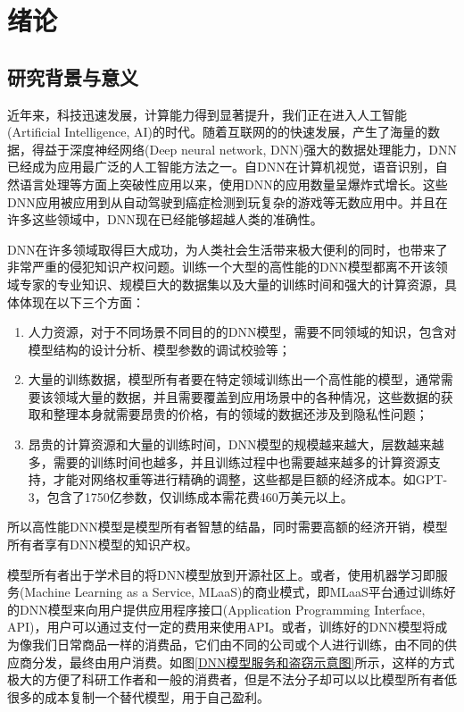 
\chapter{绪论}
\label{1}


\section{研究背景与意义}

近年来，科技迅速发展，计算能力得到显著提升，我们正在进入人工智能(Artificial Intelligence, AI)\cite{winston1984artificial}的时代。随着互联网的的快速发展，产生了海量的数据，得益于深度神经网络(Deep neural network, DNN)\cite{sze2017efficient}强大的数据处理能力，DNN已经成为应用最广泛的人工智能方法之一。自DNN在计算机视觉\cite{he2016identity,cortes2015advances,simonyan2014very}，语音识别\cite{nassif2019speech}，自然语言处理\cite{collobert2011natural,wu2016google,xiong2016achieving}等方面上突破性应用以来，使用DNN的应用数量呈爆炸式增长。这些DNN应用被应用到从自动驾驶\cite{chen2015deepdriving}到癌症检测\cite{esteva2017dermatologist}到玩复杂的游戏\cite{silver2017mastering}等无数应用中。并且在许多这些领域中，DNN现在已经能够超越人类的准确性。

DNN在许多领域取得巨大成功，为人类社会生活带来极大便利的同时，也带来了非常严重的侵犯知识产权问题。训练一个大型的高性能的DNN模型都离不开该领域专家的专业知识、规模巨大的数据集以及大量的训练时间和强大的计算资源，具体体现在以下三个方面：
\begin{enumerate}
	\renewcommand{\labelenumi}{\theenumi)}
	\item 人力资源，对于不同场景不同目的的DNN模型，需要不同领域的知识，包含对模型结构的设计分析、模型参数的调试校验等；
	\item 大量的训练数据，模型所有者要在特定领域训练出一个高性能的模型，通常需要该领域大量的数据，并且需要覆盖到应用场景中的各种情况，这些数据的获取和整理本身就需要昂贵的价格，有的领域的数据还涉及到隐私性问题；
	\item 昂贵的计算资源和大量的训练时间，DNN模型的规模越来越大，层数越来越多，需要的训练时间也越多，并且训练过程中也需要越来越多的计算资源支持，才能对网络权重等进行精确的调整，这些都是巨额的经济成本。如GPT-3\cite{brown2020language}，包含了1750亿参数，仅训练成本需花费460万美元以上。
\end{enumerate}
所以高性能DNN模型是模型所有者智慧的结晶，同时需要高额的经济开销，模型所有者享有DNN模型的知识产权。

模型所有者出于学术目的将DNN模型放到开源社区上。或者，使用机器学习即服务(Machine Learning as a Service, MLaaS)的商业模式，即MLaaS平台通过训练好的DNN模型来向用户提供应用程序接口(Application Programming Interface, API)，用户可以通过支付一定的费用来使用API。或者，训练好的DNN模型将成为像我们日常商品一样的消费品，它们由不同的公司或个人进行训练，由不同的供应商分发，最终由用户消费。如图\ref{DNN模型服务和盗窃示意图}所示，这样的方式极大的方便了科研工作者和一般的消费者，但是不法分子却可以以比模型所有者低很多的成本复制一个替代模型，用于自己盈利。

